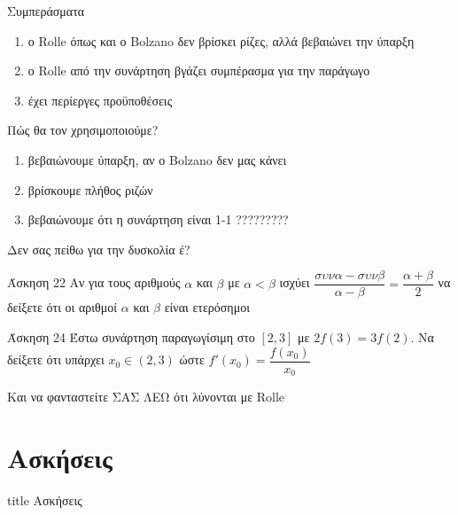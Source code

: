\documentclass{presentation}
\begin{document}
\begin{frame}{Συμπεράσματα}
  \begin{enumerate}
    \item<1-> ο Rolle όπως και ο Bolzano δεν βρίσκει ρίζες, αλλά βεβαιώνει την ύπαρξη
    \item<2-> ο Rolle από την συνάρτηση βγάζει συμπέρασμα για την παράγωγο
    \item<3-> έχει περίεργες προϋποθέσεις
  \end{enumerate}
\end{frame}

\begin{frame}{Πώς θα τον χρησιμοποιούμε?}
  \begin{enumerate}
    \item<1-> βεβαιώνουμε ύπαρξη, αν ο Bolzano δεν μας κάνει
    \item<2-> βρίσκουμε πλήθος ριζών
    \item<3-> βεβαιώνουμε ότι η συνάρτηση είναι 1-1 ?????????
  \end{enumerate}
\end{frame}

\begin{frame}{Δεν σας πείθω για την δυσκολία έ?}
  \begin{block}{Άσκηση 22}
    Αν για τους αριθμούς $α$ και $β$ με $α<β$ ισχύει $\dfrac{συνα-συνβ}{α-β}=\dfrac{α+β}{2}$ να δείξετε ότι οι αριθμοί $α$ και $β$ είναι ετερόσημοι
  \end{block}
  \begin{block}{Άσκηση 24}
    Έστω συνάρτηση παραγωγίσιμη στο $[2,3]$ με $2f(3)=3f(2)$. Να δείξετε ότι υπάρχει $x_0\in (2,3)$ ώστε $f'(x_0)=\dfrac{f(x_0)}{x_0}$
  \end{block}
   Και να φανταστείτε ΣΑΣ ΛΕΩ ότι λύνονται με Rolle
\end{frame}



\section{Ασκήσεις}

\begin{frame}[noframenumbering]
  \vfill
  \centering
  \begin{beamercolorbox}[sep=8pt,center,shadow=true,rounded=true]{title}
    Ασκήσεις
  \end{beamercolorbox}
  \vfill
\end{frame}
\end{document}
